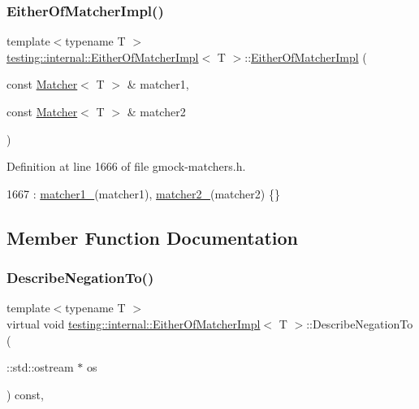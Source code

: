 \subsubsection{\texorpdfstring{Either\+Of\+Matcher\+Impl()}{EitherOfMatcherImpl()}}
{\footnotesize\ttfamily template$<$typename T $>$ \\
\hyperlink{classtesting_1_1internal_1_1EitherOfMatcherImpl}{testing\+::internal\+::\+Either\+Of\+Matcher\+Impl}$<$ T $>$\+::\hyperlink{classtesting_1_1internal_1_1EitherOfMatcherImpl}{Either\+Of\+Matcher\+Impl} (\begin{DoxyParamCaption}\item[{const \hyperlink{classtesting_1_1Matcher}{Matcher}$<$ T $>$ \&}]{matcher1,  }\item[{const \hyperlink{classtesting_1_1Matcher}{Matcher}$<$ T $>$ \&}]{matcher2 }\end{DoxyParamCaption})\hspace{0.3cm}{\ttfamily [inline]}}



Definition at line 1666 of file gmock-\/matchers.\+h.


\begin{DoxyCode}
1667       : \hyperlink{classtesting_1_1internal_1_1EitherOfMatcherImpl_ae4ac9a56093a18b90168cc6f8a3be9d3}{matcher1\_}(matcher1), \hyperlink{classtesting_1_1internal_1_1EitherOfMatcherImpl_a73b3d0e53d7bca7ffb324d3a904eb62f}{matcher2\_}(matcher2) \{\}
\end{DoxyCode}


\subsection{Member Function Documentation}
\mbox{\label{classtesting_1_1internal_1_1EitherOfMatcherImpl_ab5a4eac981acde377a4fd344507b1d71}} 
\subsubsection{\texorpdfstring{Describe\+Negation\+To()}{DescribeNegationTo()}}
{\footnotesize\ttfamily template$<$typename T $>$ \\
virtual void \hyperlink{classtesting_1_1internal_1_1EitherOfMatcherImpl}{testing\+::internal\+::\+Either\+Of\+Matcher\+Impl}$<$ T $>$\+::Describe\+Negation\+To (\begin{DoxyParamCaption}\item[{\+::std\+::ostream $\ast$}]{os }\end{DoxyParamCaption}) const\hspace{0.3cm}{\ttfamily [inline]}, {\ttfamily [virtual]}}



